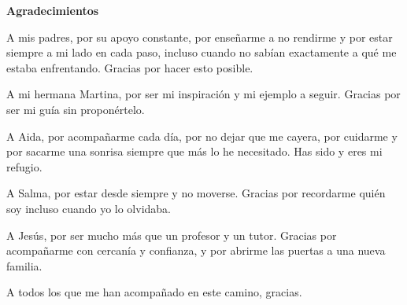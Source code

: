 \textbf{Agradecimientos}

\vspace{0.3cm}

A mis padres, por su apoyo constante, por enseñarme a no rendirme y por estar siempre a mi lado en cada paso, incluso cuando no sabían exactamente a qué me estaba enfrentando. Gracias por hacer esto posible. 

\vspace{0.3cm}

A mi hermana Martina, por ser mi inspiración y mi ejemplo a seguir. Gracias por ser mi guía sin proponértelo.

\vspace{0.3cm}

A Aida, por acompañarme cada día, por no dejar que me cayera, por cuidarme y por sacarme una sonrisa siempre que más lo he necesitado. Has sido y eres mi refugio.

\vspace{0.3cm}

A Salma, por estar desde siempre y no moverse. Gracias por recordarme quién soy incluso cuando yo lo olvidaba.

\vspace{0.3cm}

A Jesús, por ser mucho más que un profesor y un tutor. Gracias por acompañarme con cercanía y confianza, y por abrirme las puertas a una nueva familia.

\vspace{0.3cm}

A todos los que me han acompañado en este camino, gracias.